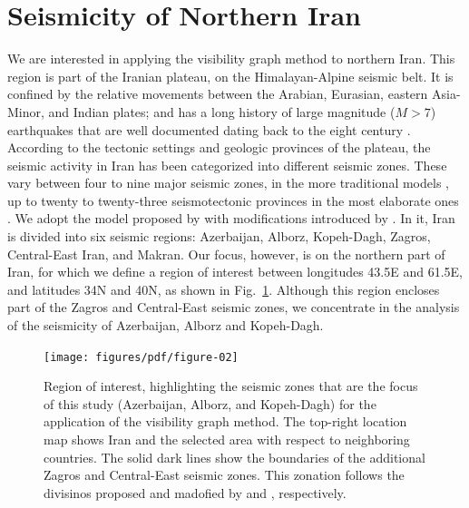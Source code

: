 
\section{Seismicity of Northern Iran}

We are interested in applying the visibility graph method to northern Iran. This region is part of the Iranian plateau, on the Himalayan-Alpine seismic belt. It is confined by the relative movements between the Arabian, Eurasian, eastern Asia-Minor, and Indian plates; and has a long history of large magnitude ($M>7$) earthquakes that are well documented dating back to the eight century \citep[e.g.,][]{Berberian_1981_Chap}. According to the tectonic settings and geologic provinces of the plateau, the seismic activity in Iran has been categorized into different seismic zones. These vary between four to nine major seismic zones, in the more traditional models \citep[e.g.,][]{Stocklin1968, Takin1972, Berberian1976}, up to twenty to twenty-three seismotectonic provinces in the most elaborate ones \citep[e.g.,][]{Nowroozi1976, Tavakoli1999}. We adopt the model proposed by \citet{Mirzaei1998} with modifications introduced by \citet{Karimiparidari2013}. In it, Iran is divided into six seismic regions: Azerbaijan, Alborz, Kopeh-Dagh, Zagros, Central-East Iran, and Makran. Our focus, however, is on the northern part of Iran, for which we define a region of interest between longitudes 43.5\textdegree{}E and 61.5\textdegree{}E, and latitudes 34\textdegree{}N and 40\textdegree{}N, as shown in Fig.~\ref{fig:study_region}. Although this region encloses part of the Zagros and Central-East seismic zones, we concentrate in the analysis of the seismicity of Azerbaijan, Alborz and Kopeh-Dagh.

\begin{figure}[t]
	\centering
	\texttt{[image: figures/pdf/figure-02]} 
	\caption{Region of interest, highlighting the seismic zones that are the focus of this study (Azerbaijan, Alborz, and Kopeh-Dagh) for the application of the visibility graph method. The top-right location map shows Iran and the selected area with respect to neighboring countries. The solid dark lines show the boundaries of the additional Zagros and Central-East seismic zones. This zonation follows the divisinos proposed and madofied by \citet{Mirzaei1998} and \citet{Karimiparidari2013}, respectively.}
	\label{fig:study_region}
\end{figure}

